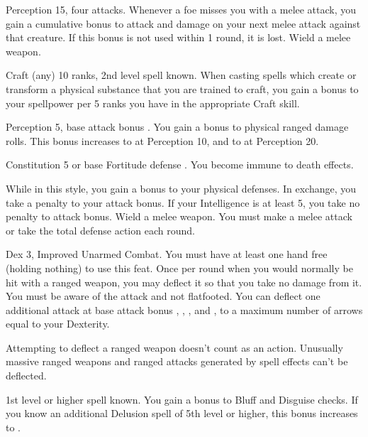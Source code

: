 \featpres Perception 15, four attacks.
\featben Whenever a foe misses you with a melee attack, you gain a cumulative  bonus to attack and damage on your next melee attack against that creature.
If this bonus is not used within 1 round, it is lost.
\stylereq Wield a melee weapon.

\featpres Craft (any) 10 ranks, 2nd level spell known.
\featben When casting spells which create or transform a physical substance that you are trained to craft, you gain a  bonus to your spellpower per 5 ranks you have in the appropriate Craft skill.

\featpres Perception 5, base attack bonus .
\featben You gain a  bonus to physical ranged damage rolls.
This bonus increases to  at Perception 10, and to  at Perception 20.

\featpre Constitution 5 or base Fortitude defense .
\featben You become immune to death effects.

\featben While in this style, you gain a  bonus to your physical defenses.
In exchange, you take a  penalty to your attack bonus.
If your Intelligence is at least 5, you take no penalty to attack bonus.
\stylereq Wield a melee weapon. You must make a melee attack or take the total defense action each round.

\featpres Dex 3, Improved Unarmed Combat.
\featben You must have at least one hand free (holding nothing) to use this feat.
Once per round when you would normally be hit with a ranged weapon, you may deflect it so that you take no damage from it.
You must be aware of the attack and not flatfooted.
You can deflect one additional attack at base attack bonus , , , and , to a maximum number of arrows equal to your Dexterity.
\par Attempting to deflect a ranged weapon doesn't count as an action.
Unusually massive ranged weapons and ranged attacks generated by spell effects can't be deflected.

\featpre 1st level or higher  spell known.
\featben You gain a  bonus to Bluff and Disguise checks.
If you know an additional Delusion spell of 5th level or higher, this bonus increases to .

